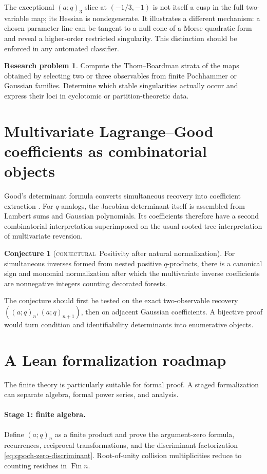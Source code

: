 \documentclass[11pt,letterpaper,oneside,openany]{book}
\theoremstyle{definition}
\newtheorem{researchproblem}[theorem]{Research problem}
\newtheorem{conjecture}[theorem]{Conjecture}
\theoremstyle{remark}
\newcommand{\statusconjectural}{\textcolor{conjectureorange}{\textsc{conjectural}}}
\begin{document}
The exceptional \((a;q)_3\) slice at \((-1/3,-1)\) is not itself a cusp in the
full two-variable map; its Hessian is nondegenerate.  It illustrates a
different mechanism: a chosen parameter line can be tangent to a null cone of
a Morse quadratic form and reveal a higher-order restricted singularity.
This distinction should be enforced in any automated classifier.

\begin{researchproblem}
Compute the Thom--Boardman strata of the maps obtained by selecting two or
three observables from finite Pochhammer or Gaussian families.  Determine
which stable singularities actually occur and express their loci in
cyclotomic or partition-theoretic data.
\end{researchproblem}

\section{Multivariate Lagrange--Good coefficients as combinatorial objects}
Good's determinant formula converts simultaneous recovery into coefficient
extraction \cite{Good1960}.  For \(q\)-analogs, the Jacobian determinant itself
is assembled from Lambert sums and Gaussian polynomials.  Its coefficients
therefore have a second combinatorial interpretation superimposed on the
usual rooted-tree interpretation of multivariate reversion.

\begin{conjecture}[\statusconjectural\ Positivity after natural normalization]
For simultaneous inverses formed from nested positive \(q\)-products, there is
a canonical sign and monomial normalization after which the multivariate
inverse coefficients are nonnegative integers counting decorated forests.
\end{conjecture}
The conjecture should first be tested on the exact two-observable recovery
\(((a;q)_n,(a;q)_{n+1})\), then on adjacent Gaussian coefficients.  A
bijective proof would turn condition and identifiability determinants into
enumerative objects.

\section{A Lean formalization roadmap}
The finite theory is particularly suitable for formal proof.  A staged
formalization can separate algebra, formal power series, and analysis.

\paragraph{Stage 1: finite algebra.}
Define \((a;q)_n\) as a finite product and prove the argument-zero formula,
recurrences, reciprocal transformations, and the discriminant factorization
\eqref{eq:qpoch-zero-discriminant}.  Root-of-unity collision multiplicities
reduce to counting residues in \(\operatorname{Fin} n\).
\end{document}
